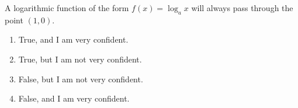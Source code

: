 \bigskip

\item  A logarithmic function of the form $f(x)=\log_a x$ will always pass through the point $(1,0)$.

\begin{enumerate}
\item True, and I am very confident.
\item True, but I am not very confident.
\item False, but I am not very confident.
\item False, and I am very confident.
\end{enumerate}


